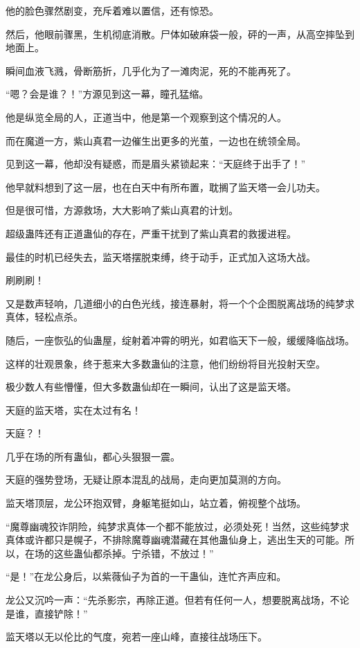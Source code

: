 \begin{this_body}
他的脸色骤然剧变，充斥着难以置信，还有惊恐。

然后，他眼前骤黑，生机彻底消散。尸体如破麻袋一般，砰的一声，从高空摔坠到地面上。

瞬间血液飞溅，骨断筋折，几乎化为了一滩肉泥，死的不能再死了。

“嗯？会是谁？！”方源见到这一幕，瞳孔猛缩。

他是纵览全局的人，正道当中，他是第一个观察到这个情况的人。

而在魔道一方，紫山真君一边催生出更多的光茧，一边也在统领全局。

见到这一幕，他却没有疑惑，而是眉头紧锁起来：“天庭终于出手了！”

他早就料想到了这一层，也在白天中有所布置，耽搁了监天塔一会儿功夫。

但是很可惜，方源救场，大大影响了紫山真君的计划。

超级蛊阵还有正道蛊仙的存在，严重干扰到了紫山真君的救援进程。

最佳的时机已经失去，监天塔摆脱束缚，终于动手，正式加入这场大战。

刷刷刷！

又是数声轻响，几道细小的白色光线，接连暴射，将一个个企图脱离战场的纯梦求真体，轻松点杀。

随后，一座恢弘的仙蛊屋，绽射着冲霄的明光，如君临天下一般，缓缓降临战场。

这样的壮观景象，终于惹来大多数蛊仙的注意，他们纷纷将目光投射天空。

极少数人有些懵懂，但大多数蛊仙却在一瞬间，认出了这是监天塔。

天庭的监天塔，实在太过有名！

天庭？！

几乎在场的所有蛊仙，都心头狠狠一震。

天庭的强势登场，无疑让原本混乱的战局，走向更加莫测的方向。

监天塔顶层，龙公环抱双臂，身躯笔挺如山，站立着，俯视整个战场。

“魔尊幽魂狡诈阴险，纯梦求真体一个都不能放过，必须处死！当然，这些纯梦求真体或许都只是幌子，不排除魔尊幽魂潜藏在其他蛊仙身上，逃出生天的可能。所以，在场的这些蛊仙都杀掉。宁杀错，不放过！”

“是！”在龙公身后，以紫薇仙子为首的一干蛊仙，连忙齐声应和。

龙公又沉吟一声：“先杀影宗，再除正道。但若有任何一人，想要脱离战场，不论是谁，直接铲除！”

监天塔以无以伦比的气度，宛若一座山峰，直接往战场压下。


\end{this_body}
